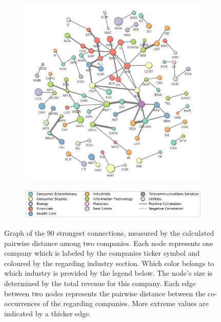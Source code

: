 
\begin{figure}
    \centering
    \begin{subfigure}[b]{\textwidth}
        \centering
        \includegraphics[width=\textwidth]{figures/text/graph-pair-dist-999-42.jpg}
    \end{subfigure}
    \vfill
    \begin{subfigure}[b]{\textwidth}
        \centering
        \includegraphics[width=\textwidth]{figures/graph-legend.pdf}
    \end{subfigure}

    \caption{Graph of the 90 strongest connections, measured by the calculated pairwise distance among two companies. Each node represents one company which is labeled by the companies ticker symbol and coloured by the regarding industry section. Which color belongs to which industry is provided by the legend below. The node's size is determined by the total revenue for this company. Each edge between two nodes represents the pairwise distance between the co-occurrences of the regarding companies. More extreme values are indicated by a thicker edge.}
    \label{fig:graph-cooccurrence-pairwise}
\end{figure}

